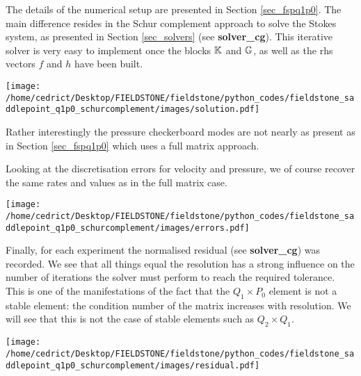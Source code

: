 The details of the numerical setup are presented in Section \ref{sec_fspq1p0}.
The main difference resides in the Schur complement approach to solve the 
Stokes system, as presented in Section \ref{sec_solvers} (see {\bf solver\_cg}).
This iterative solver is very easy to implement once the blocks ${\mathbb{K}}$ and ${\mathbb{G}}$, 
as well as the rhs vectors $f$ and $h$ have been built. 



\texttt{[image: /home/cedrict/Desktop/FIELDSTONE/fieldstone/python\_codes/fieldstone\_saddlepoint\_q1p0\_schurcomplement/images/solution.pdf]}

Rather interestingly the pressure checkerboard modes are not nearly as present as in Section \ref{sec_fspq1p0} which uses a full matrix approach. 

Looking at the discretisation errors for velocity and pressure, we of course recover the same rates and values as in the full matrix case.

\texttt{[image: /home/cedrict/Desktop/FIELDSTONE/fieldstone/python\_codes/fieldstone\_saddlepoint\_q1p0\_schurcomplement/images/errors.pdf]}

Finally, for each experiment the normalised residual (see {\bf solver\_cg}) was recorded. We see that 
all things equal the resolution has a strong influence on the number of iterations the solver must
perform to reach the required tolerance. This is one of the manifestations of the fact that the 
$Q_1 \times P_0$ element is not a stable element: the condition number of the matrix increases with 
resolution. We will see that this is not the case of stable elements such as $Q_2\times Q_1$.

\texttt{[image: /home/cedrict/Desktop/FIELDSTONE/fieldstone/python\_codes/fieldstone\_saddlepoint\_q1p0\_schurcomplement/images/residual.pdf]}
 
